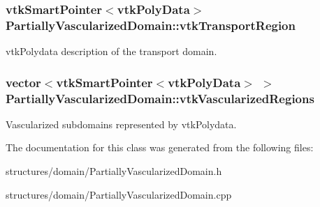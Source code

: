 \subsubsection[{\texorpdfstring{vtk\+Transport\+Region}{vtkTransportRegion}}]{\setlength{\rightskip}{0pt plus 5cm}vtk\+Smart\+Pointer$<$vtk\+Poly\+Data$>$ Partially\+Vascularized\+Domain\+::vtk\+Transport\+Region\hspace{0.3cm}{\ttfamily [private]}}\hypertarget{class_partially_vascularized_domain_af4d0cd0bc35113adccb312f4b07dcd72}{}\label{class_partially_vascularized_domain_af4d0cd0bc35113adccb312f4b07dcd72}
vtk\+Polydata description of the transport domain. 
\subsubsection[{\texorpdfstring{vtk\+Vascularized\+Regions}{vtkVascularizedRegions}}]{\setlength{\rightskip}{0pt plus 5cm}vector$<$vtk\+Smart\+Pointer$<$vtk\+Poly\+Data$>$ $>$ Partially\+Vascularized\+Domain\+::vtk\+Vascularized\+Regions\hspace{0.3cm}{\ttfamily [private]}}\hypertarget{class_partially_vascularized_domain_aeacff4635f73c185d8a83a3a824b49cb}{}\label{class_partially_vascularized_domain_aeacff4635f73c185d8a83a3a824b49cb}
Vascularized subdomains represented by vtk\+Polydata. 

The documentation for this class was generated from the following files\+:\begin{DoxyCompactItemize}
\item 
structures/domain/Partially\+Vascularized\+Domain.\+h\item 
structures/domain/Partially\+Vascularized\+Domain.\+cpp\end{DoxyCompactItemize}
